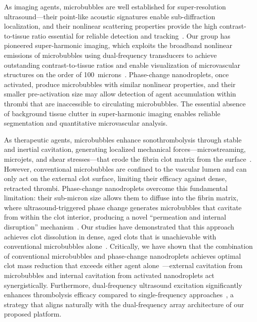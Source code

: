 As imaging agents, microbubbles are well established for super-resolution ultrasound---their point-like acoustic signatures enable sub-diffraction localization, and their nonlinear scattering properties provide the high contrast-to-tissue ratio essential for reliable detection and tracking~\cite{christensen2020super,gessner2010high,gessner2013acoustic}. Our group has pioneered super-harmonic imaging, which exploits the broadband nonlinear emissions of microbubbles using dual-frequency transducers to achieve outstanding contrast-to-tissue ratios and enable visualization of microvascular structures on the order of 100~microns~\cite{gessner2013acoustic,gessner2010high,gessner2012mapping,rao2015fingerprint,shelton2015quantification,shelton2020microvascular}. Phase-change nanodroplets, once activated, produce microbubbles with similar nonlinear properties, and their smaller pre-activation size may allow detection of agent accumulation within thrombi that are inaccessible to circulating microbubbles. The essential absence of background tissue clutter in super-harmonic imaging enables reliable segmentation and quantitative microvascular analysis.

As therapeutic agents, microbubbles enhance sonothrombolysis through stable and inertial cavitation, generating localized mechanical forces---microstreaming, microjets, and shear stresses---that erode the fibrin clot matrix from the surface~\cite{datta2006correlation,everbach2000cavitational}. However, conventional microbubbles are confined to the vascular lumen and can only act on the external clot surface, limiting their efficacy against dense, retracted thrombi. Phase-change nanodroplets overcome this fundamental limitation: their sub-micron size allows them to diffuse into the fibrin matrix, where ultrasound-triggered phase change generates microbubbles that cavitate from within the clot interior, producing a novel ``permeation and internal disruption'' mechanism~\cite{kim2020comparison,goel2021nanodroplet}. Our studies have demonstrated that this approach achieves clot dissolution in dense, aged clots that is unachievable with conventional microbubbles alone~\cite{kim2022analysis,kim2020comparison}. Critically, we have shown that the combination of conventional microbubbles and phase-change nanodroplets achieves optimal clot mass reduction that exceeds either agent alone~\cite{kim2022analysis}---external cavitation from microbubbles and internal cavitation from activated nanodroplets act synergistically. Furthermore, dual-frequency ultrasound excitation significantly enhances thrombolysis efficacy compared to single-frequency approaches~\cite{wu2021dual}, a strategy that aligns naturally with the dual-frequency array architecture of our proposed platform.

